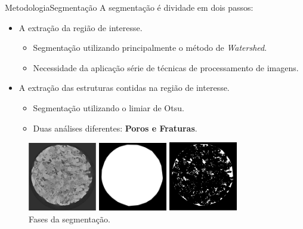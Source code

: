 \documentclass{beamer}
\begin{document}
\begin{frame}{Metodologia}{Segmentação}
 A segmentação é dividade em dois passos:
 \begin{itemize}
     \item A extração da região de interesse.
     \begin{itemize}
        \item Segmentação utilizando principalmente o método de \textit{Watershed}.
        \item Necessidade da aplicação série de técnicas de processamento de imagens. 
    \end{itemize}
    
     \item A extração das estruturas contidas na região de interesse.
     \begin{itemize}
         \item Segmentação utilizando o limiar de Otsu.
         \item Duas análises diferentes: \textbf{Poros e Fraturas}.
     \end{itemize}
 \end{itemize}

\begin{figure}[!htb]
        \centering
        \includegraphics[width=3cm]{fig/img_original.png}
        \includegraphics[width=3cm]{fig/mask.png}
        \includegraphics[width=3cm]{fig/seg_final.png}\\
        \scriptsize{Fases da segmentação.}
        \label{fig:metodoMRX}
    \end{figure}
    
\end{frame}
\end{document}
